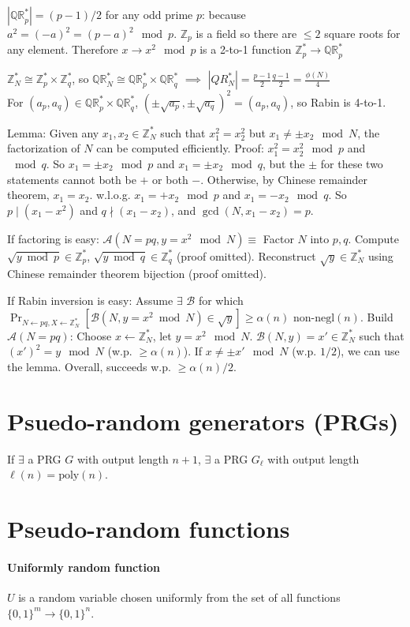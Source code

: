 \documentclass[11pt]{article}
\newcommand{\eqdef}{\ensuremath{\equiv}}
\newcommand{\abs}[1]{{\ensuremath{\left\vert#1\right\vert}}}
\newcommand{\ZZ}{\ensuremath{\mathds{Z}}}
\newcommand{\QR}{\ensuremath{\mathds{QR}}}
\newcommand{\divides}{\mid}
\newcommand{\negl}{\text{negl}}
\newcommand{\poly}{\text{poly}}
\newcommand{\AAA}{\ensuremath{\mathcal{A}}}
\newcommand{\BBB}{\ensuremath{\mathcal{B}}}
\theoremstyle{remark}
\begin{document}
$\abs{\QR_p^*}=(p-1)/2$ for any odd prime $p$:
because $a^2 = (-a)^2 = (p-a)^2 \mod p$.
$\ZZ_p$ is a field so there are $\le 2$ square roots for any element.
Therefore $x \rightarrow x^2 \mod p$ is a 2-to-1 function $\ZZ_p^* \rightarrow \QR_p^*$

$\ZZ_N^* \cong \ZZ_p^* \times \ZZ_q^*$, so $\QR_N^* \cong \QR_p^* \times \QR_q^*$
$\implies$ $\abs{QR_N^*} = \frac{p-1}{2}\frac{q-1}{2} = \frac{\phi(N)}{4}$ \\
For $(a_p, a_q) \in \QR_p^*\times\QR_q^*$, $(\pm\sqrt{a_p},\pm\sqrt{a_q})^2 = (a_p,a_q)$,
so Rabin is 4-to-1.

Lemma: Given any $x_1, x_2 \in \ZZ_N^*$ such that $x_1^2 = x_2^2$ but $x_1 \neq \pm x_2 \mod N$,
the factorization of $N$ can be computed efficiently.
Proof: $x_1^2 = x_2^2 \mod p$ and $\mod q$.
So $x_1=\pm x_2 \mod p$ and $x_1=\pm x_2 \mod q$, but the $\pm$ for these
two statements cannot both be $+$ or both $-$.
Otherwise, by Chinese remainder theorem, $x_1 = x_2$.
w.l.o.g. $x_1 = +x_2 \mod p$ and $x_1 = -x_2 \mod q$.
So $p \divides (x_1-x^2)$ and $q\nmid(x_1-x_2)$,
and $\gcd(N, x_1-x_2) = p$.

If factoring is easy: $\AAA(N=pq, y=x^2\mod N)\eqdef$
Factor $N$ into $p,q$.
Compute $\sqrt{y\bmod p}\in\ZZ_p^*$, $\sqrt{y\bmod q}\in\ZZ_q^*$ (proof omitted).
Reconstruct $\sqrt{y}\in\ZZ_N^*$ using Chinese remainder theorem bijection (proof omitted).

If Rabin inversion is easy:
Assume $\exists$ $\BBB$ for which
$\Pr_{N\gets pq,X\gets\ZZ_N^*}[\BBB(N, y=x^2\bmod N)\in\sqrt{y}] \ge \alpha(n)$ non-$\negl(n)$.
Build $\AAA(N=pq)$: Choose $x\gets\ZZ_N^*$, let $y=x^2\mod N$.
$\BBB(N, y) = x' \in \ZZ_N^*$ such that $(x')^2 = y \mod N$ (w.p. $\ge\alpha(n)$).
If $x \neq \pm x' \mod N$ (w.p. $1/2$), we can use the lemma.
Overall, succeeds w.p. $\ge \alpha(n)/2$.

\section{Psuedo-random generators (PRGs)}

If $\exists$ a PRG $G$ with output length $n+1$, $\exists$ a PRG $G_\ell$ with
output length $\ell(n) = \poly(n)$.

\section{Pseudo-random functions}

\paragraph{Uniformly random function}
$U$ is a random variable chosen uniformly from the set of all functions
$\{0,1\}^m \rightarrow \{0,1\}^n$.
\end{document}
